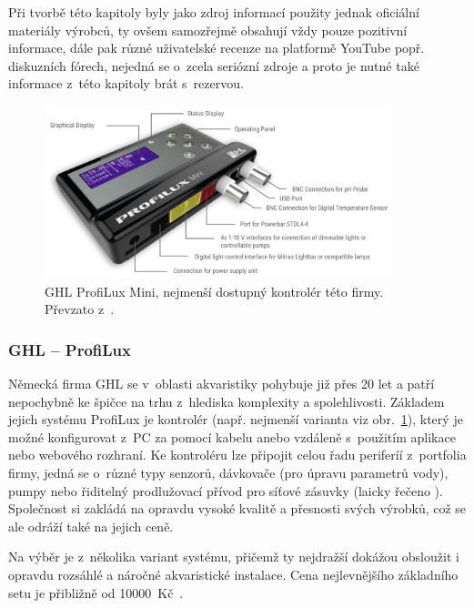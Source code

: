         Při tvorbě této kapitoly byly jako zdroj informací použity jednak oficiální materiály výrobců, ty ovšem samozřejmě obsahují vždy pouze pozitivní informace, dále pak různé uživatelské recenze na platformě YouTube popř. diskuzních fórech, nejedná se o~zcela seriózní zdroje a proto je nutné také informace z~této kapitoly brát s~rezervou. 

        \begin{figure}[h!]
            \centering
            \includegraphics[width=0.9\textwidth]{obrazky/trh/GHL-ProfiLux-Mini.jpg}
            \caption{GHL ProfiLux Mini, nejmenší dostupný kontrolér této firmy. Převzato z~\cite{ghl-profilux}.}
            \label{fig:obrazky-trh-GHL-ProfiLux-Mini-jpg}
        \end{figure}
        \subsubsection{GHL -- ProfiLux}
            Německá firma GHL se v~oblasti akvaristiky pohybuje již přes 20 let a patří nepochybně ke špičce na trhu z~hlediska komplexity a spolehlivosti. Základem jejich systému ProfiLux je kontrolér (např. nejmenší varianta viz obr.~\ref{fig:obrazky-trh-GHL-ProfiLux-Mini-jpg}), který je možné konfigurovat z~PC za pomocí kabelu anebo vzdáleně s~použitím aplikace nebo webového rozhraní. Ke kontroléru lze připojit celou řadu periferíí z~portfolia firmy, jedná se o~různé typy senzorů, dávkovače (pro úpravu parametrů vody), pumpy nebo řiditelný prodlužovací přívod pro síťové zásuvky (laicky řečeno ). Společnost si zakládá na opravdu vysoké kvalitě a přesnosti svých výrobků, což se ale odráží také na jejich ceně. 

            Na výběr je z~několika variant systému, přičemž ty nejdražší dokážou obsloužit i opravdu rozsáhlé a náročné akvaristické instalace. Cena nejlevnějšího základního setu je přibližně od \qty{10000}{Kč}~\cite{ghl-profilux,eshop-ghl-profilux-sets}.

